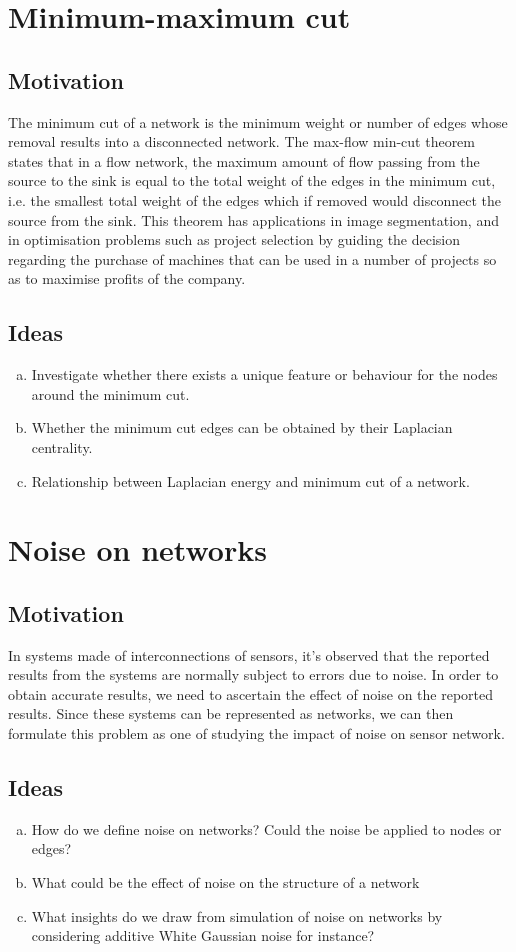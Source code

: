 \documentclass[10pt,a4paper]{article}
\begin{document}
	\section{Minimum-maximum cut}
	\subsection{Motivation}
	The minimum cut of a network is the minimum weight or number of edges whose removal results into a disconnected network. The max-flow min-cut theorem states that in a flow network, the maximum amount of flow passing from the source to the sink is equal to the total weight of the edges in the minimum cut, i.e. the smallest total weight of the edges which if removed would disconnect the source from the sink. This theorem has applications in image segmentation, and in optimisation problems such as project selection by guiding the decision regarding the purchase of machines that can be used in a number of projects so as to maximise profits of the company.
	\subsection{Ideas}
	\begin{enumerate}[a)]
	\item Investigate whether there exists a unique feature or behaviour for the nodes around the minimum cut.
	\item Whether the minimum cut edges can be obtained by their Laplacian centrality.
	\item  Relationship between Laplacian energy and minimum cut of a network.
	\end{enumerate}
	\section{Noise on networks}
	\subsection{Motivation}
	In systems made of interconnections of sensors, it's observed that the reported results from  the systems are normally subject to errors due to noise. In order to obtain accurate results, we need to ascertain the effect of noise on the reported results. Since these systems can be represented as networks, we can then formulate this problem as one of studying the impact of noise on sensor network. 
	\subsection{Ideas}
	\begin{enumerate}[a)]
		\item How do we define noise on networks? Could the noise be applied to nodes or edges? 
		\item What could be the effect of noise on the structure of a network
		\item What insights do we draw from simulation of noise on networks by considering additive White Gaussian noise for instance?
	\end{enumerate}
	
\end{document}

